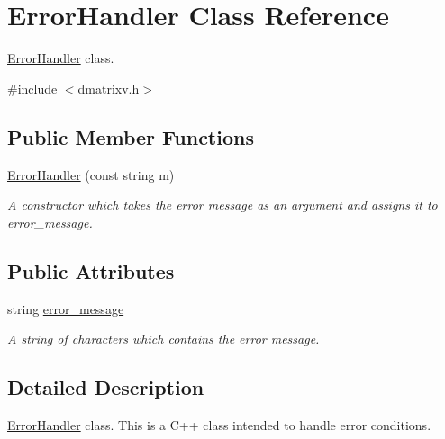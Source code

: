 \hypertarget{classErrorHandler}{
\section{ErrorHandler Class Reference}
\label{classErrorHandler}
}


\hyperlink{classErrorHandler}{ErrorHandler} class.  




{\ttfamily \#include $<$dmatrixv.h$>$}

\subsection*{Public Member Functions}
\begin{DoxyCompactItemize}
\item 
\hyperlink{classErrorHandler_a6d507618dc2e6ba1d83f7f9efcb0053a}{ErrorHandler} (const string m)
\begin{DoxyCompactList}\small\item\em A constructor which takes the error message as an argument and assigns it to error\_\-message. \item\end{DoxyCompactList}\end{DoxyCompactItemize}
\subsection*{Public Attributes}
\begin{DoxyCompactItemize}
\item 
\hypertarget{classErrorHandler_a4eb3e8f364dab7bee13c79e51b323bf8}{
string \hyperlink{classErrorHandler_a4eb3e8f364dab7bee13c79e51b323bf8}{error\_\-message}}
\label{classErrorHandler_a4eb3e8f364dab7bee13c79e51b323bf8}

\begin{DoxyCompactList}\small\item\em A string of characters which contains the error message. \item\end{DoxyCompactList}\end{DoxyCompactItemize}


\subsection{Detailed Description}
\hyperlink{classErrorHandler}{ErrorHandler} class. This is a C++ class intended to handle error conditions. 

